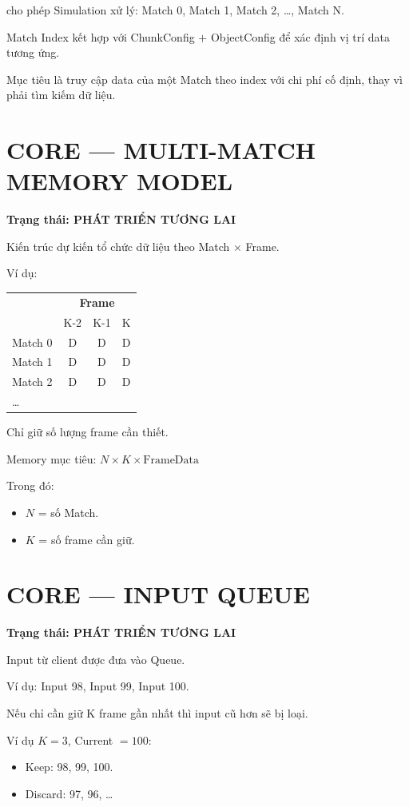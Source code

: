 \documentclass[12pt,a4paper]{article}
\begin{document}
cho phép Simulation xử lý: Match 0, Match 1, Match 2, \ldots, Match N.

Match Index kết hợp với ChunkConfig $+$ ObjectConfig để xác định vị trí data tương ứng.

Mục tiêu là truy cập data của một Match theo index với chi phí cố định, thay vì phải tìm kiếm dữ liệu.

\section{CORE --- MULTI-MATCH MEMORY MODEL}
\textbf{Trạng thái: PHÁT TRIỂN TƯƠNG LAI}

Kiến trúc dự kiến tổ chức dữ liệu theo Match $\times$ Frame.

Ví dụ:

\begin{center}
\begin{tabular}{l c c c}
\hline
 & \multicolumn{3}{c}{\textbf{Frame}} \\
 & K-2 & K-1 & K \\
\hline
Match 0 & D & D & D \\
Match 1 & D & D & D \\
Match 2 & D & D & D \\
\ldots & & & \\
\hline
\end{tabular}
\end{center}

Chỉ giữ số lượng frame cần thiết.

Memory mục tiêu: $N \times K \times \text{FrameData}$

Trong đó:
\begin{itemize}[nosep]
  \item $N$ = số Match.
  \item $K$ = số frame cần giữ.
\end{itemize}

\section{CORE --- INPUT QUEUE}
\textbf{Trạng thái: PHÁT TRIỂN TƯƠNG LAI}

Input từ client được đưa vào Queue.

Ví dụ: Input 98, Input 99, Input 100.

Nếu chỉ cần giữ K frame gần nhất thì input cũ hơn sẽ bị loại.

Ví dụ $K = 3$, Current $= 100$:
\begin{itemize}[nosep]
  \item Keep: 98, 99, 100.
  \item Discard: 97, 96, \ldots
\end{itemize}
\end{document}
